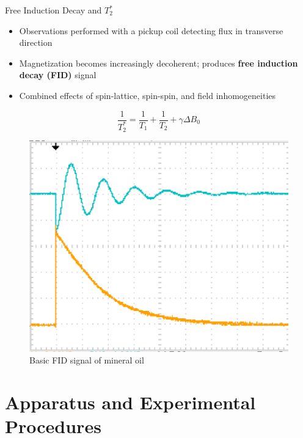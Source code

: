 \documentclass[aspectratio=169,xcolor=dvipsnames]{beamer}
\begin{document}
\begin{frame}{Free Induction Decay and $T_2^*$}

    \begin{minipage}{0.6\textwidth}
        \begin{itemize}
            \item Observations performed with a pickup coil detecting flux in transverse direction
            \item Magnetization becomes increasingly decoherent; produces \textbf{free induction decay (FID)} signal
            \item Combined effects of spin-lattice, spin-spin, and field inhomogeneities \cite{principles-resonance}
        \end{itemize}
        \begin{equation}
            \frac{1}{T_2^*} = \frac{1}{T_1}+\frac{1}{T_2}+ \gamma \Delta B_0
        \end{equation}
    \end{minipage}
    \hfill
    \begin{minipage}{0.3\textwidth}
        \begin{figure}
            \centering
            \includegraphics[width=\textwidth]{figs/basic_fid.png}
            \caption{Basic FID signal of mineral oil \cite{lab-manual}}
        \end{figure}
    \end{minipage}
    
\section{Apparatus and Experimental Procedures}
\end{frame}
\end{document}
